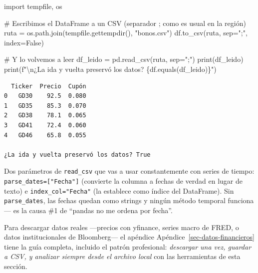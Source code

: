 \documentclass[
  spanish,
  letterpaper,
  DIV=11,
  numbers=noendperiod]{scrreprt}
\newenvironment{Shaded}{\begin{snugshade}}{\end{snugshade}}
\newcommand{\BuiltInTok}[1]{\textcolor[rgb]{0.00,0.23,0.31}{#1}}
\newcommand{\CharTok}[1]{\textcolor[rgb]{0.13,0.47,0.30}{#1}}
\newcommand{\CommentTok}[1]{\textcolor[rgb]{0.37,0.37,0.37}{#1}}
\newcommand{\ImportTok}[1]{\textcolor[rgb]{0.00,0.46,0.62}{#1}}
\newcommand{\NormalTok}[1]{\textcolor[rgb]{0.00,0.23,0.31}{#1}}
\newcommand{\OperatorTok}[1]{\textcolor[rgb]{0.37,0.37,0.37}{#1}}
\newcommand{\SpecialCharTok}[1]{\textcolor[rgb]{0.37,0.37,0.37}{#1}}
\newcommand{\SpecialStringTok}[1]{\textcolor[rgb]{0.13,0.47,0.30}{#1}}
\newcommand{\StringTok}[1]{\textcolor[rgb]{0.13,0.47,0.30}{#1}}
\newcommand{\VariableTok}[1]{\textcolor[rgb]{0.07,0.07,0.07}{#1}}
\begin{document}
\label{io-ejemplo}
\begin{Shaded}
\begin{Highlighting}[]
\ImportTok{import}\NormalTok{ tempfile, os}

\CommentTok{\# Escribimos el DataFrame a un CSV (separador ; como es usual en la región)}
\NormalTok{ruta }\OperatorTok{=}\NormalTok{ os.path.join(tempfile.gettempdir(), }\StringTok{"bonos.csv"}\NormalTok{)}
\NormalTok{df.to\_csv(ruta, sep}\OperatorTok{=}\StringTok{";"}\NormalTok{, index}\OperatorTok{=}\VariableTok{False}\NormalTok{)}

\CommentTok{\# Y lo volvemos a leer}
\NormalTok{df\_leido }\OperatorTok{=}\NormalTok{ pd.read\_csv(ruta, sep}\OperatorTok{=}\StringTok{";"}\NormalTok{)}
\BuiltInTok{print}\NormalTok{(df\_leido)}
\BuiltInTok{print}\NormalTok{(}\SpecialStringTok{f"}\CharTok{\textbackslash{}n}\SpecialStringTok{¿La ida y vuelta preservó los datos? }\SpecialCharTok{\{}\NormalTok{df}\SpecialCharTok{.}\NormalTok{equals(df\_leido)}\SpecialCharTok{\}}\SpecialStringTok{"}\NormalTok{)}
\end{Highlighting}
\end{Shaded}

\begin{verbatim}
  Ticker  Precio  Cupón
0   GD30    92.5  0.080
1   GD35    85.3  0.070
2   GD38    78.1  0.065
3   GD41    72.4  0.060
4   GD46    65.8  0.055

¿La ida y vuelta preservó los datos? True
\end{verbatim}

Dos parámetros de \texttt{read\_csv} que vas a usar constantemente con
series de tiempo: \texttt{parse\_dates={[}"Fecha"{]}} (convierte la
columna a fechas de verdad en lugar de texto) e
\texttt{index\_col="Fecha"} (la establece como índice del DataFrame).
Sin \texttt{parse\_dates}, las fechas quedan como strings y ningún
método temporal funciona --- es la causa \#1 de ``pandas no me ordena
por fecha''.

\begin{tcolorbox}[enhanced jigsaw, bottomrule=.15mm, colback=white, opacitybacktitle=0.6, arc=.35mm, toprule=.15mm, opacityback=0, breakable, titlerule=0mm, left=2mm, coltitle=black, colbacktitle=quarto-callout-note-color!10!white, colframe=quarto-callout-note-color-frame, leftrule=.75mm, toptitle=1mm, bottomtitle=1mm, title=\textcolor{quarto-callout-note-color}{\faInfo}\hspace{0.5em}{¿Y de dónde saco los datos?}, rightrule=.15mm]

Para descargar datos reales ---precios con yfinance, series macro de
FRED, o datos institucionales de Bloomberg--- el apéndice
Apéndice~\ref{sec-datos-financieros} tiene la guía completa, incluido el
patrón profesional: \emph{descargar una vez, guardar a CSV, y analizar
siempre desde el archivo local} con las herramientas de esta sección.

\end{tcolorbox}
\end{document}
